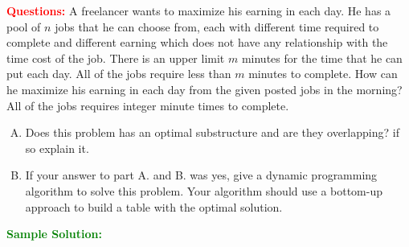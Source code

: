 \problem

\textcolor{Red}{\textbf{Questions:}}
A freelancer wants to maximize his earning in each day. He has a pool of $n$ jobs that he can choose from, each with different time required to complete and different earning which does not have any relationship with the time cost of the job. There is an upper limit $m$ minutes for the time that he can put each day. All of the jobs require less than $m$ minutes to complete. How can he maximize his earning in each day from the given posted jobs in the morning? All of the jobs requires integer minute times to complete.

\begin{enumerate}[A.]
	\item Does this problem has an optimal substructure and are they overlapping? if so explain it.
	\item If your answer to part A. and B. was yes, give a dynamic programming algorithm to solve this problem. Your algorithm should use a bottom-up approach to build a table with the optimal solution.
\end{enumerate}


\textcolor{Green}{\textbf{Sample Solution:}}

